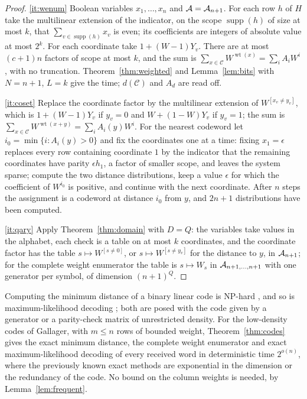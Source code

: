 \begin{proof}
\ref{it:wenum} Boolean variables $x_1,\dots,x_n$ and $\mathcal{A}=\mathcal{A}_{n+1}$. For each row
$h$ of $H$ take the multilinear extension of the indicator, on the scope
$\operatorname{supp}(h)$ of size at most $k$, that $\sum_{v\in\operatorname{supp}(h)}x_v$
is even; its coefficients are integers of absolute value at most $2^{k}$. For
each coordinate take $1+(W-1)Y_v$. There are at most $(c+1)n$ factors of scope at
most $k$, and the sum is $\sum_{x\in\mathcal C}W^{\operatorname{wt}(x)}=\sum_iA_iW^{i}$,
with no truncation. Theorem~\ref{thm:weighted} and Lemma~\ref{lem:bits} with
$N=n+1$, $L=k$ give the time; $d(\mathcal C)$ and $A_{d}$ are read off.

\ref{it:coset} Replace the coordinate factor by the multilinear extension of
$W^{[x_v\ne y_v]}$, which is $1+(W-1)Y_v$ if $y_v=0$ and $W+(1-W)Y_v$ if $y_v=1$;
the sum is $\sum_{x\in\mathcal C}W^{\operatorname{wt}(x+y)}=\sum_iA_i(y)W^{i}$. For
the nearest codeword let $i_0=\min\{i:A_i(y)>0\}$ and fix the coordinates one at
a time: fixing $x_1=\epsilon$ replaces every row containing coordinate $1$ by
the indicator that the remaining coordinates have parity $\epsilon h_1$, a
factor of smaller scope, and leaves the system sparse; compute the two distance
distributions, keep a value $\epsilon$ for which the coefficient of
$W^{i_0}$ is positive, and continue with the next coordinate. After $n$ steps the
assignment is a codeword at distance $i_0$ from $y$, and $2n+1$ distributions
have been computed.

\ref{it:qary} Apply Theorem~\ref{thm:domain} with $D=Q$: the variables take
values in the alphabet, each check is a table on at most $k$ coordinates, and
the coordinate factor has the table $s\mapsto W^{[s\ne0]}$, or
$s\mapsto W^{[s\ne y_v]}$ for the distance to $y$, in $\mathcal{A}_{n+1}$; for the
complete weight enumerator the table is $s\mapsto W_s$ in
$\mathcal{A}_{n+1,\dots,n+1}$ with one generator per symbol, of dimension $(n+1)^{Q}$.
\end{proof}

\begin{remark}
Computing the minimum distance of a binary linear code is NP-hard
\cite{Var97}, and so is maximum-likelihood decoding \cite{BMT78}; both are
posed with the code given by a generator or a parity-check matrix of
unrestricted density. For the low-density codes of Gallager, with $m\le n$ rows
of bounded weight, Theorem~\ref{thm:codes} gives the exact minimum distance, the
complete weight enumerator and exact maximum-likelihood decoding of every
received word in deterministic time $2^{o(n)}$, where the previously known
exact methods are exponential in the dimension or the redundancy of the code.
No bound on the column weights is needed, by Lemma~\ref{lem:frequent}.
\end{remark}

